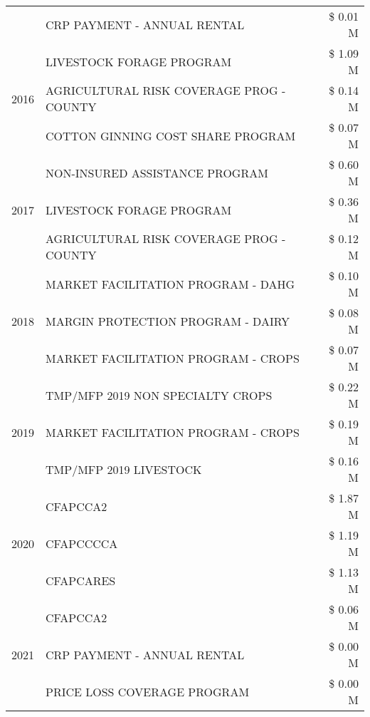 \begin{tabular}{llr}
 & CRP PAYMENT - ANNUAL RENTAL & \$ 0.01 M \\
\cline{1-3}
\multirow[t]{3}{*}{2016} & LIVESTOCK FORAGE PROGRAM                      & \$ 1.09 M \\
 & AGRICULTURAL RISK COVERAGE PROG - COUNTY      & \$ 0.14 M \\
 & COTTON GINNING COST SHARE PROGRAM             & \$ 0.07 M \\
\cline{1-3}
\multirow[t]{3}{*}{2017} & NON-INSURED ASSISTANCE PROGRAM & \$ 0.60 M \\
 & LIVESTOCK FORAGE PROGRAM & \$ 0.36 M \\
 & AGRICULTURAL RISK COVERAGE PROG - COUNTY & \$ 0.12 M \\
\cline{1-3}
\multirow[t]{3}{*}{2018} & MARKET FACILITATION PROGRAM - DAHG & \$ 0.10 M \\
 & MARGIN PROTECTION PROGRAM - DAIRY & \$ 0.08 M \\
 & MARKET FACILITATION PROGRAM - CROPS & \$ 0.07 M \\
\cline{1-3}
\multirow[t]{3}{*}{2019} & TMP/MFP 2019 NON SPECIALTY CROPS & \$ 0.22 M \\
 & MARKET FACILITATION PROGRAM - CROPS & \$ 0.19 M \\
 & TMP/MFP 2019 LIVESTOCK & \$ 0.16 M \\
\cline{1-3}
\multirow[t]{3}{*}{2020} & CFAPCCA2 & \$ 1.87 M \\
 & CFAPCCCCA & \$ 1.19 M \\
 & CFAPCARES & \$ 1.13 M \\
\cline{1-3}
\multirow[t]{3}{*}{2021} & CFAPCCA2 & \$ 0.06 M \\
 & CRP PAYMENT - ANNUAL RENTAL & \$ 0.00 M \\
 & PRICE LOSS COVERAGE PROGRAM & \$ 0.00 M \\
\cline{1-3}
\bottomrule
\end{tabular}
